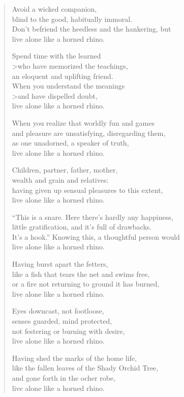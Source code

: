 \documentclass[12pt,openany]{book}%
\begin{document}
\begin{verse}
Avoid a wicked companion, \\
blind to the good, habitually immoral. \\
Don’t befriend the heedless and the hankering, but \\
live alone like a horned rhino. 

Spend time with the learned \\>who have memorized the teachings, \\
an eloquent and uplifting friend. \\
When you understand the meanings \\>and have dispelled doubt, \\
live alone like a horned rhino. 

When you realize that worldly fun and games \\
and pleasure are unsatisfying, disregarding them, \\
as one unadorned, a speaker of truth, \\
live alone like a horned rhino. 

Children, partner, father, mother, \\
wealth and grain and relatives: \\
having given up sensual pleasures to this extent, \\
live alone like a horned rhino. 

“This is a snare. Here there’s hardly any happiness, \\
little gratification, and it’s full of drawbacks. \\
It’s a hook.” Knowing this, a thoughtful person would \\
live alone like a horned rhino. 

Having burst apart the fetters, \\
like a fish that tears the net and swims free, \\
or a fire not returning to ground it has burned, \\
live alone like a horned rhino. 

Eyes downcast, not footloose, \\
senses guarded, mind protected, \\
not festering or burning with desire, \\
live alone like a horned rhino. 

Having shed the marks of the home life, \\
like the fallen leaves of the Shady Orchid Tree, \\
and gone forth in the ocher robe, \\
live alone like a horned rhino. 


\end{verse}
\end{document}
